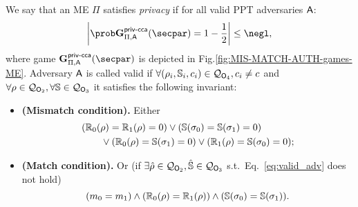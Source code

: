 \begin{definition}[Privacy of ME]\label{def:me_priv}
    We say that an ME $\Pi$ satisfies {\em privacy} if for all valid PPT adversaries $\mathsf{A}$:
    \[
        \left\lvert \Prob{\NISHmatchgamecca{}_{\Pi, \adversary}(\secpar) = 1} - \frac{1}{2} \right\rvert \leq \negl,
    \]
    where game $\NISHmatchgamecca{}_{\Pi, \adversary}(\secpar)$ is depicted in Fig.\ref{fig:MIS-MATCH-AUTH-games-ME}.
    Adversary $\mathsf{A}$ is called valid if $\forall (\rho_i, \mathbb{S}_i, c_i) \in \mathcal{Q}_{\mathsf{O}_4}, c_i \ne c$ and $\forall \rho \in \mathcal{Q}_{\mathsf{O}_2}, \forall \mathbb{S} \in \mathcal{Q}_{\mathsf{O}_3}$ it satisfies the following invariant:
    \begin{itemize}
        \item \textbf{(Mismatch condition).} Either
              \begin{align}
                   & (\mathbb{R}_0(\rho) = \mathbb{R}_1(\rho)=0) \lor (\mathbb{S}(\sigma_0) = \mathbb{S}(\sigma_1)=0) \nonumber                         \\
                   & \qquad \lor (\mathbb{R}_0(\rho) = \mathbb{S}(\sigma_1)=0) \lor (\mathbb{R}_1(\rho) = \mathbb{S}(\sigma_0)=0); \label{eq:valid_adv}
              \end{align}
        \item \textbf{(Match condition).} Or (if $\exists\hat{\rho} \in \mathcal{Q}_{\mathsf{O}_2}, \hat{\mathbb{S}} \in \mathcal{Q}_{\mathsf{O}_3}$ s.t.\ Eq.~\eqref{eq:valid_adv} does not hold)
              \[
                  (m_0 = m_1) \land (\mathbb{R}_0(\rho) =\mathbb{R}_1(\rho)) \land (\mathbb{S}(\sigma_0) = \mathbb{S}(\sigma_1)).
              \]
    \end{itemize}
\end{definition}
